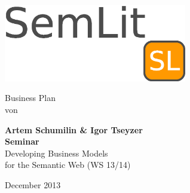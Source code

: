 \documentclass[11pt, a4paper]{article} %
\begin{document}
\thispagestyle{empty}

\begin{titlepage}
\begin{center}

\hbox{}
\vskip 1.8cm

\includegraphics[width=0.6\textwidth]{./logo}~

\hbox{}
\vfill
\vskip 1cm
Business Plan\\
von\\[2mm]
\vskip 1cm

{\large\bfseries Artem Schumilin \& Igor Tseyzer\\}
\vskip 3cm
{\bfseries Seminar}\\
Developing Business Models \\
for the Semantic Web (WS 13/14) \\
\vskip 2cm

\vskip 2cm
December 2013

\end{center}
\vfill
\end{titlepage}


\tableofcontents
\newpage



\newpage



\newpage

\newpage


\newpage


\newpage


\newpage


\newpage
\end{document}
